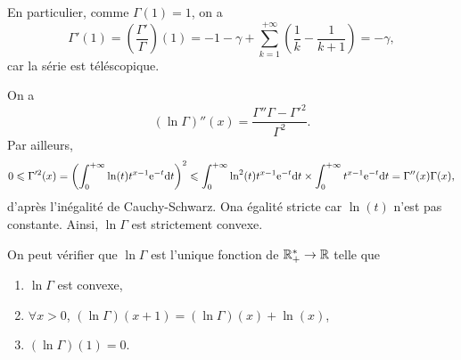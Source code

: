 \begin{remark}
    En particulier, comme $\Gamma(1)=1$, on a 
        \begin{equation}
            \Gamma'(1)=\left(\frac{\Gamma'}{\Gamma}\right)(1)=-1-\gamma+\sum_{k=1}^{+\infty}\left(\frac{1}{k}-\frac{1}{k+1}\right)=-\gamma,
        \end{equation}
    car la série est téléscopique.
\end{remark}

\begin{remark}
    On a 
    \begin{equation}
        \left(\ln\Gamma\right)''(x)=\frac{\Gamma''\Gamma-\Gamma'^{2}}{\Gamma^{2}}.
    \end{equation}
    Par ailleurs,
    \begin{equation}
        0\leqslant\Gamma'^{2}(x)=\left(\int_{0}^{+\infty}\ln(t)t^{x-1}\mathrm{e}^{-t}\mathrm{d} t\right)^{2}\leqslant\int_{0}^{+\infty}\ln^{2}(t)t^{x-1}\mathrm{e}^{-t}\mathrm{d} t\times\int_{0}^{+\infty}t^{x-1}\mathrm{e}^{-t}\mathrm{d} t=\Gamma''(x)\Gamma(x),
    \end{equation}
    d'après l'inégalité de Cauchy-Schwarz. Ona égalité stricte car $\ln(t)$ n'est pas constante. Ainsi, $\ln\Gamma$ est strictement convexe.
\end{remark}

\begin{remark}
    On peut vérifier que $\ln\Gamma$ est l'unique fonction de $\mathbb{R}_{+}^{*}\to\mathbb{R}$ telle que 
    \begin{enumerate}
        \item $\ln\Gamma$ est convexe,
        \item $\forall x>0$, $\left(\ln\Gamma\right)(x+1)=\left(\ln\Gamma\right)(x)+\ln(x)$,
        \item $\left(\ln\Gamma\right)(1)=0$.
    \end{enumerate}
\end{remark}

